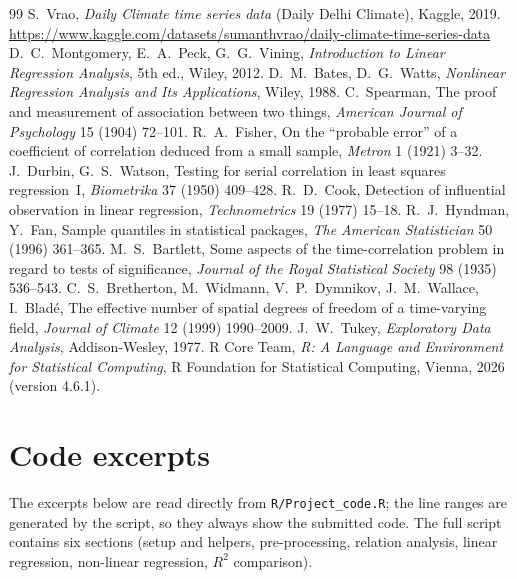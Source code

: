 \documentclass[11pt,a4paper]{article}
\newcommand{\Rsq}{R^2}
\begin{document}
\begin{thebibliography}{99}
 S.~Vrao, \emph{Daily Climate time series data} (Daily Delhi Climate),
  Kaggle, 2019. \url{https://www.kaggle.com/datasets/sumanthvrao/daily-climate-time-series-data}
 D.~C.~Montgomery, E.~A.~Peck, G.~G.~Vining, \emph{Introduction to Linear
  Regression Analysis}, 5th ed., Wiley, 2012.
 D.~M.~Bates, D.~G.~Watts, \emph{Nonlinear Regression Analysis and Its
  Applications}, Wiley, 1988.
 C.~Spearman, The proof and measurement of association between two things,
  \emph{American Journal of Psychology} 15 (1904) 72--101.
 R.~A.~Fisher, On the ``probable error'' of a coefficient of correlation deduced
  from a small sample, \emph{Metron} 1 (1921) 3--32.
 J.~Durbin, G.~S.~Watson, Testing for serial correlation in least squares
  regression~I, \emph{Biometrika} 37 (1950) 409--428.
 R.~D.~Cook, Detection of influential observation in linear regression,
  \emph{Technometrics} 19 (1977) 15--18.
 R.~J.~Hyndman, Y.~Fan, Sample quantiles in statistical packages,
  \emph{The American Statistician} 50 (1996) 361--365.
 M.~S.~Bartlett, Some aspects of the time-correlation problem in regard to
  tests of significance, \emph{Journal of the Royal Statistical Society} 98 (1935) 536--543.
 C.~S.~Bretherton, M.~Widmann, V.~P.~Dymnikov, J.~M.~Wallace, I.~Blad\'e,
  The effective number of spatial degrees of freedom of a time-varying field,
  \emph{Journal of Climate} 12 (1999) 1990--2009.
 J.~W.~Tukey, \emph{Exploratory Data Analysis}, Addison-Wesley, 1977.
 R Core Team, \emph{R: A Language and Environment for Statistical Computing},
  R Foundation for Statistical Computing, Vienna, 2026 (version 4.6.1).
\end{thebibliography}

\clearpage
\appendix
\section{Code excerpts}

The excerpts below are read directly from \texttt{R/Project\_code.R}; the line ranges
are generated by the script, so they always show the submitted code. The full script
contains six sections (setup and helpers, pre-processing, relation analysis, linear
regression, non-linear regression, $\Rsq$ comparison).
\end{document}
